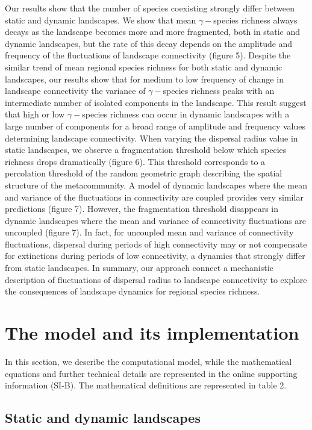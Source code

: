 \documentclass[12pt]{article}
\begin{document}
Our results show that the number of species coexisting strongly differ between static and dynamic landscapes. We show that mean $\gamma-$species richness always decays as the landscape becomes more and more fragmented, both in static and dynamic landscapes, but the rate of this decay depends on the amplitude and frequency of the fluctuations of landscape connectivity (figure 5). Despite the similar trend of mean regional species richness for both static and dynamic landscapes, our results show that for medium to low frequency of change in landscape connectivity the variance of $\gamma-$species richness peaks with an intermediate number of isolated components in the landscape. This result suggest that high or low $\gamma-$species richness can occur in dynamic landscapes with a large number of components for a broad range of amplitude and frequency values determining landscape connectivity. When varying the dispersal radius value in static landscapes, we observe a fragmentation threshold below which species richness drops dramatically (figure 6). This threshold corresponds to a percolation threshold of the random geometric graph describing the spatial structure of the metacommunity. A model of dynamic landscapes where the mean and variance of the fluctuations in connectivity are coupled provides very similar predictions (figure 7). However, the fragmentation threshold disappears in dynamic landscapes where the mean and variance of connectivity fluctuations are uncoupled (figure 7). In fact, for uncoupled mean and variance of connectivity fluctuations, dispersal during periods of high connectivity may or not compensate for extinctions during periods of low connectivity, a dynamics that strongly differ from static landscapes. In summary, our approach connect a mechanistic description of fluctuations of dispersal radius to landscape connectivity to explore the consequences of landscape dynamics for regional species richness. 

\section*{The model and its implementation}

In this section, we describe the computational model, while the mathematical equations and further technical details are represented in the online supporting information (SI-B). The mathematical definitions are represented in table 2.

\subsection*{Static and dynamic landscapes}
\end{document}
